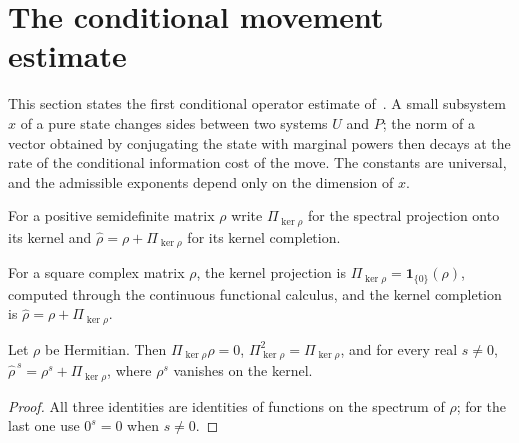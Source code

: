 
\section{The conditional movement estimate}
\label{ch:conditional_movement}

This section states the first conditional operator estimate
of~\cite[Lemma~5.1]{OpenAI2026AreaLaw}. A small subsystem $x$ of a pure state
changes sides between two systems $U$ and $P$; the norm of a vector obtained
by conjugating the state with marginal powers then decays at the rate of the
conditional information cost of the move. The constants are universal, and
the admissible exponents depend only on the dimension of $x$.

For a positive semidefinite matrix $\rho$ write $\Pi_{\ker\rho}$ for the
spectral projection onto its kernel and $\widehat\rho=\rho+\Pi_{\ker\rho}$ for
its kernel completion.

\begin{definition}
    \label{def:kernel_completion}
    \leanok
    For a square complex matrix $\rho$, the kernel projection is
    $\Pi_{\ker\rho}=\mathbf 1_{\{0\}}(\rho)$, computed through the continuous
    functional calculus, and the kernel completion is
    $\widehat\rho=\rho+\Pi_{\ker\rho}$.
\end{definition}

\begin{lemma}
    \label{lem:kernel_completion_rpow}
    \leanok
    Let $\rho$ be Hermitian. Then $\Pi_{\ker\rho}\rho=0$,
    $\Pi_{\ker\rho}^2=\Pi_{\ker\rho}$, and for every real $s\ne0$,
    $\widehat\rho^{\,s}=\rho^s+\Pi_{\ker\rho}$, where $\rho^s$ vanishes on the
    kernel.
\end{lemma}

\begin{proof}\leanok
    All three identities are identities of functions on the spectrum of
    $\rho$; for the last one use $0^s=0$ when $s\ne0$.
\end{proof}

